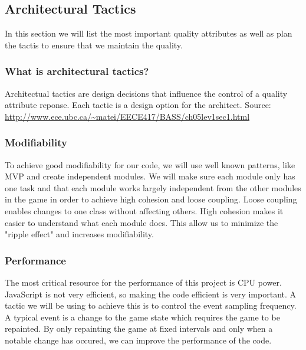 \subsection{Architectural Tactics}
In this section we will list the most important quality attributes as well as plan the tactis to 
ensure that we maintain the quality.

\subsubsection*{What is architectural tactics? }
Architectual tactics are design decisions that influence the control of a quality attribute reponse. 
Each tactic is a design option for the architect. 
Source: \url{http://www.ece.ubc.ca/~matei/EECE417/BASS/ch05lev1sec1.html}

\subsubsection*{Modifiability}
To achieve good modifiability for our code, we will use well known patterns, like MVP and create 
independent modules. We will make sure each module only has one task and that each module works 
largely independent from the other modules in the game in order to achieve high cohesion and loose 
coupling. Loose coupling enables changes to one class without affecting others. High cohesion makes 
it easier to understand what each module does. This allow us to minimize the "ripple effect" and 
increases modifiability.

\subsubsection*{Performance}
The most critical resource for the performance of this project is CPU power. JavaScript is not very 
efficient, so making the code efficient is very important. A tactic we will be using to achieve this 
is to control the event sampling frequency. A typical event is a change to the game state which 
requires the game to be repainted. By only repainting the game at fixed intervals and only when a 
notable change has occured, we can improve the performance of the code.